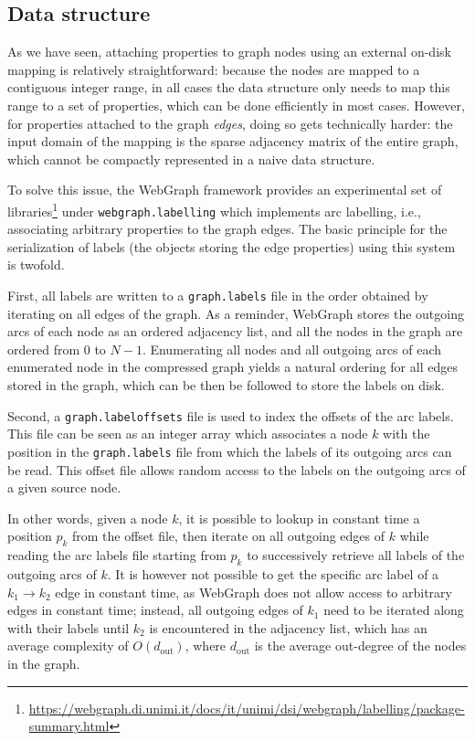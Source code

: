 \subsection{Data structure}%
\label{sec:label-data-structure}

As we have seen, attaching properties to graph nodes using an external
on-disk mapping is relatively straightforward: because the nodes are mapped to
a contiguous integer range, in all cases the data structure only needs to map
this range to a set of properties, which can be done efficiently in most cases.
However, for properties attached to the graph \emph{edges}, doing so gets
technically harder: the input domain of the mapping is the sparse adjacency
matrix of the entire graph, which cannot be compactly represented in a naive
data structure.

To solve this issue, the WebGraph framework provides an experimental set of
libraries\footnote{\url{https://webgraph.di.unimi.it/docs/it/unimi/dsi/webgraph/labelling/package-summary.html}}
under \texttt{webgraph.labelling} which implements arc labelling, i.e.,
associating arbitrary properties to the graph edges. The basic principle for
the serialization of labels (the objects storing the edge properties) using
this system is twofold.

First, all labels are written to a \texttt{graph.labels} file in the order
obtained by iterating on all edges of the graph.  As a reminder, WebGraph
stores the outgoing arcs of each node as an ordered adjacency list, and all the
nodes in the graph are ordered from $0$ to $N-1$.  Enumerating all nodes
and all outgoing arcs of each enumerated node in the compressed graph
yields a natural ordering for all edges stored in the graph, which can be
then be followed to store the labels on disk.

Second, a \texttt{graph.labeloffsets} file is used to index the offsets of the
arc labels. This file can be seen as an integer array which associates a node
$k$ with the position in the \texttt{graph.labels} file from which the labels
of its outgoing arcs can be read. This offset file allows random access to the
labels on the outgoing arcs of a given source node.

In other words, given a node $k$, it is possible to lookup in constant time
a position $p_k$ from the offset file, then iterate on all outgoing edges
of $k$ while reading the arc labels file starting from $p_k$ to
successively retrieve all labels of the outgoing arcs of $k$. It is however not
possible to get the specific arc label of a $k_1 \to k_2$ edge in constant
time, as WebGraph does not allow access to arbitrary edges in constant time;
instead, all outgoing edges of $k_1$ need to be iterated along with their
labels until $k_2$ is encountered in the adjacency list, which has an average
complexity of $O(d_{\mathrm{out}})$, where $d_{\mathrm{out}}$ is the average
out-degree of the nodes in the graph.

